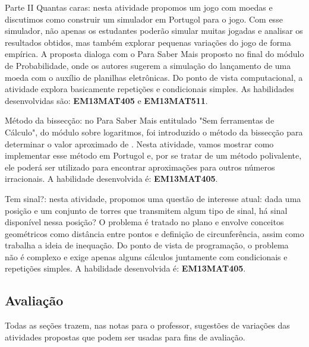 \begin{paginatexto}{Parte II}
Quantas caras: nesta atividade propomos um jogo com moedas e discutimos como construir um simulador em Portugol para o jogo. Com esse simulador, não apenas os estudantes poderão simular muitas jogadas e analisar os resultados obtidos, mas também explorar pequenas variações do jogo de forma empírica. A proposta dialoga com o Para Saber Mais proposto no final do módulo de Probabilidade, onde os autores sugerem a simulação do lançamento de uma moeda com o auxílio de planilhas eletrônicas. Do ponto de vista computacional, a atividade explora basicamente repetições e condicionais simples. As habilidades desenvolvidas são: \textbf{EM13MAT405} e \textbf{EM13MAT511}.

Método da bissecção: no Para Saber Mais entitulado "Sem ferramentas de Cálculo", do módulo sobre logaritmos, foi introduzido o método da bissecção para determinar o valor aproximado de . Nesta atividade, vamos mostrar como implementar esse método em Portugol e, por se tratar de um método polivalente, ele poderá ser utilizado para encontrar aproximações para outros números irracionais. A habilidade desenvolvida é: \textbf{EM13MAT405}.

Tem sinal?: nesta atividade, propomos uma questão de interesse atual: dada uma posição e um conjunto de torres que transmitem algum tipo de sinal, há sinal disponível nessa posição? O problema é tratado no plano e envolve conceitos geométricos como distância entre pontos e definição de circunferência, assim como trabalha a ideia de inequação. Do ponto de vista de programação, o problema não é complexo e exige apenas alguns cálculos juntamente com condicionais e repetições simples. A habilidade desenvolvida é: \textbf{EM13MAT405}.

\subsection{Avaliação}

Todas as seções trazem, nas notas para o professor, sugestões de variações das atividades propostas que podem ser usadas para fins de avaliação.
\end{paginatexto}

